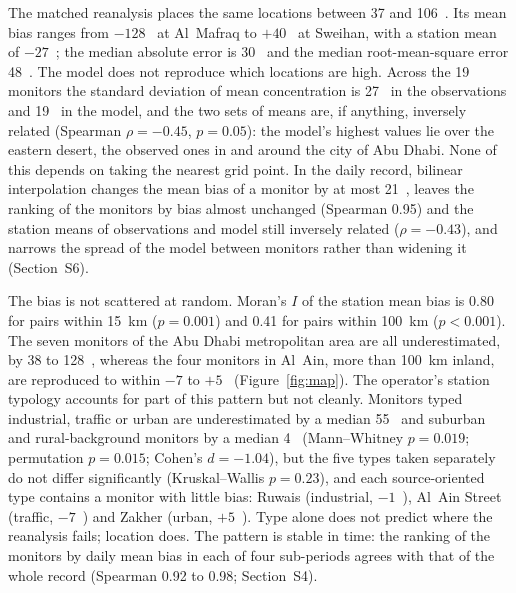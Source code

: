 The matched reanalysis places the same locations between 37 and 106~\ugm{}. Its mean bias ranges
from $-128$~\ugm{} at Al~Mafraq to $+40$~\ugm{} at Sweihan, with a station mean of $-27$~\ugm{};
the median absolute error is 30~\ugm{} and the median root-mean-square error 48~\ugm{}. The model
does not reproduce which locations are high. Across the 19 monitors the standard deviation of
mean concentration is 27~\ugm{} in the observations and 19~\ugm{} in the model, and the two sets
of means are, if anything, inversely related (Spearman $\rho=-0.45$, $p=0.05$): the model's
highest values lie over the eastern desert, the observed ones in and around the city of Abu Dhabi.
None of this depends on taking the nearest grid point. In the daily record, bilinear interpolation
changes the mean bias of a monitor by at most 21~\ugm{}, leaves the ranking of the monitors by
bias almost unchanged (Spearman 0.95) and the station means of observations and model still
inversely related ($\rho=-0.43$), and narrows the spread of the model between monitors rather
than widening it (Section~S6).

The bias is not scattered at random. Moran's $I$ of the station mean bias is 0.80 for pairs
within 15~km ($p=0.001$) and 0.41 for pairs within 100~km ($p<0.001$). The seven monitors of the
Abu Dhabi metropolitan area are all underestimated, by 38 to 128~\ugm{}, whereas the four
monitors in Al~Ain, more than 100~km inland, are reproduced to within $-7$ to $+5$~\ugm{}
(Figure~\ref{fig:map}). The operator's station typology accounts for part of this pattern but not
cleanly. Monitors typed industrial, traffic or urban are underestimated by a median 55~\ugm{} and
suburban and rural-background monitors by a median 4~\ugm{} (Mann--Whitney $p=0.019$; permutation
$p=0.015$; Cohen's $d=-1.04$), but the five types taken separately do not differ significantly
(Kruskal--Wallis $p=0.23$), and each source-oriented type contains a monitor with little bias:
Ruwais (industrial, $-1$~\ugm{}), Al~Ain Street (traffic, $-7$~\ugm{}) and Zakher (urban,
$+5$~\ugm{}). Type alone does not predict where the reanalysis fails; location does. The pattern
is stable in time: the ranking of the monitors by daily mean bias in each of four sub-periods
agrees with that of the whole record (Spearman 0.92 to 0.98; Section~S4).

